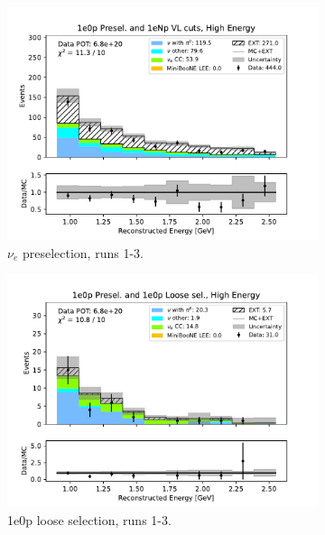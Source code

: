 \begin{figure}[H]
    \centering
    \begin{subfigure}{0.33\linewidth}
    \includegraphics[width=\linewidth]{technote/Sidebands/Figures/FarSideband/far_sideband_reco_e_run123_ZP_ZP_HIGH_ENERGY.pdf}
    \caption{$\nu_e$ preselection, runs 1-3.}
    \end{subfigure}%
    \begin{subfigure}{0.33\linewidth}
    \includegraphics[width=\linewidth]{technote/Sidebands/Figures/FarSideband/far_sideband_reco_e_run123_ZP_ZPLOOSESEL_HIGH_ENERGY.pdf}
    \caption{1e0p loose selection, runs 1-3.}
    \end{subfigure}%
    \begin{subfigure}{0.33\linewidth}

\end{subfigure}
\end{figure}

